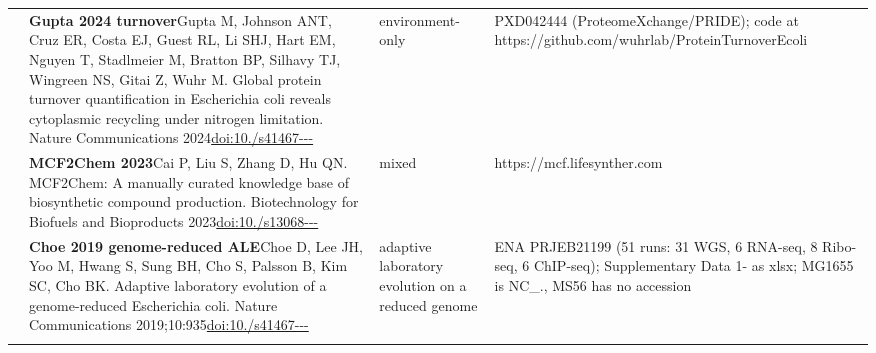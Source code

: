 \begin{landscape}
\begin{longtable}{@{}r@{\hspace{4pt}} L{86mm} L{74mm} L{78mm}@{}}
 & \textbf{Gupta 2024 turnover}\newline Gupta M, Johnson ANT, Cruz ER, Costa EJ, Guest RL, Li SHJ, Hart EM, Nguyen T, Stadlmeier M, Bratton BP, Silhavy TJ, Wingreen NS, Gitai Z, Wuhr M. Global protein turnover quantification in Escherichia coli reveals cytoplasmic recycling under nitrogen limitation. Nature Communications 2024\newline \href{https://doi.org/10.1038/s41467-024-49920-8}{doi:10./\allowbreak s41467---} & environment-only & PXD042444 (ProteomeXchange/\allowbreak PRIDE); code at https:/\allowbreak /\allowbreak github.\allowbreak com/\allowbreak wuhrlab/\allowbreak ProteinTurnoverEcoli \\
 & \textbf{MCF2Chem 2023}\newline Cai P, Liu S, Zhang D, Hu QN. MCF2Chem: A manually curated knowledge base of biosynthetic compound production. Biotechnology for Biofuels and Bioproducts 2023\newline \href{https://doi.org/10.1186/s13068-023-02419-8}{doi:10./\allowbreak s13068---} & mixed & https:/\allowbreak /\allowbreak mcf.\allowbreak lifesynther.\allowbreak com \\
 & \textbf{Choe 2019 genome-reduced ALE}\newline Choe D, Lee JH, Yoo M, Hwang S, Sung BH, Cho S, Palsson B, Kim SC, Cho BK. Adaptive laboratory evolution of a genome-reduced Escherichia coli. Nature Communications 2019;10:935\newline \href{https://doi.org/10.1038/s41467-019-08888-6}{doi:10./\allowbreak s41467---} & adaptive laboratory evolution on a reduced genome & ENA PRJEB21199 (51 runs: 31 WGS, 6 RNA-\allowbreak seq, 8 Ribo-\allowbreak seq, 6 ChIP-\allowbreak seq); Supplementary Data 1- as xlsx; MG1655 is NC\_., MS56 has no accession \\
\addlinespace[5pt]

\end{longtable}
\end{landscape}

